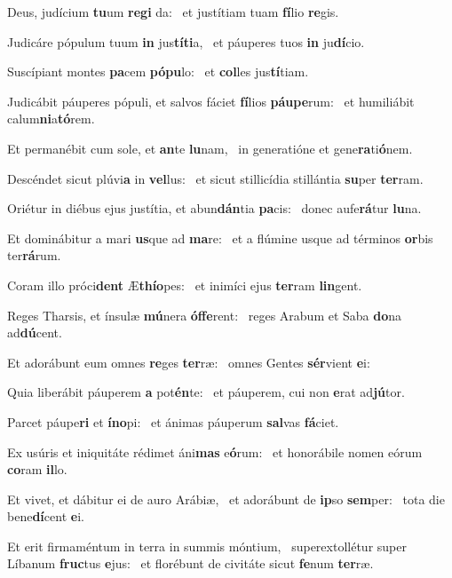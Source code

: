 \item Deus, judícium \textbf{tu}um \textbf{re}\textbf{gi} da:~\psstar{} et justítiam tuam \textbf{fí}lio \textbf{re}gis.
\item Judicáre pópulum tuum \textbf{in} jus\textbf{tí}\textbf{ti}a,~\psstar{} et páuperes tuos \textbf{in} ju\textbf{dí}cio.
\item Suscípiant montes \textbf{pa}cem \textbf{pó}\textbf{pu}lo:~\psstar{} et \textbf{col}les jus\textbf{tí}tiam.
\item Judicábit páuperes pópuli, et salvos fáciet \textbf{fí}lios \textbf{páu}\textbf{pe}rum:~\psstar{} et humiliábit calum\textbf{ni}a\textbf{tó}rem.
\item Et permanébit cum sole, et \textbf{an}te \textbf{lu}nam,~\psstar{} in generatióne et gene\textbf{ra}ti\textbf{ó}nem.
\item Descéndet sicut plúvi\textbf{a} in \textbf{vel}lus:~\psstar{} et sicut stillicídia stillántia \textbf{su}per \textbf{ter}ram.
\item Oriétur in diébus ejus justítia, et abun\textbf{dán}tia \textbf{pa}cis:~\psstar{} donec aufe\textbf{rá}tur \textbf{lu}na.
\item Et dominábitur a mari \textbf{us}que ad \textbf{ma}re:~\psstar{} et a flúmine usque ad términos \textbf{or}bis ter\textbf{rá}rum.
\item Coram illo próci\textbf{dent} Æ\textbf{thí}\textbf{o}pes:~\psstar{} et inimíci ejus \textbf{ter}ram \textbf{lin}gent.
\item Reges Tharsis, et ínsulæ \textbf{mú}nera \textbf{óf}\textbf{fe}rent:~\psstar{} reges Arabum et Saba \textbf{do}na ad\textbf{dú}cent.
\item Et adorábunt eum omnes \textbf{re}ges \textbf{ter}ræ:~\psstar{} omnes Gentes \textbf{sér}vient \textbf{e}i:
\item Quia liberábit páuperem \textbf{a} pot\textbf{én}te:~\psstar{} et páuperem, cui non \textbf{e}rat ad\textbf{jú}tor.
\item Parcet páupe\textbf{ri} et \textbf{ín}\textbf{o}pi:~\psstar{} et ánimas páuperum \textbf{sal}vas \textbf{fá}ciet.
\item Ex usúris et iniquitáte rédimet áni\textbf{mas} e\textbf{ó}rum:~\psstar{} et honorábile nomen eórum \textbf{co}ram \textbf{il}lo.
\item Et vivet, et dábitur ei de auro Arábiæ,~\pscross{} et adorábunt de \textbf{ip}so \textbf{sem}per:~\psstar{} tota die bene\textbf{dí}cent \textbf{e}i.
\item Et erit firmaméntum in terra in summis móntium,~\pscross{} superextollétur super Líbanum \textbf{fruc}tus \textbf{e}jus:~\psstar{} et florébunt de civitáte sicut \textbf{fe}num \textbf{ter}ræ.

